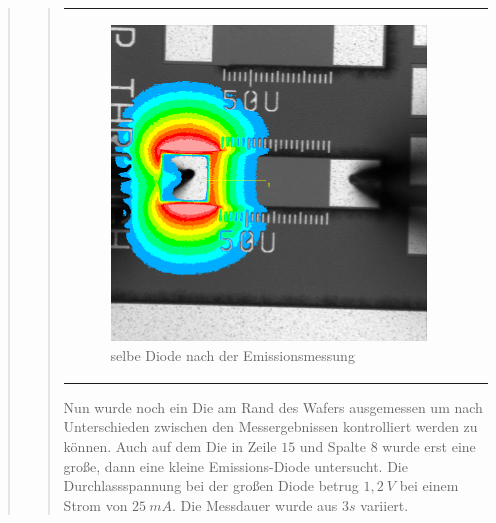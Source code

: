 \begin{quote}
\begin{quote}
\begin{center}
\begin{tabular}{ll}
\begin{minipage}{0.6\textwidth}
                         \begin{figure}[H]
                            \label{fig:asdfasdfasdfggg}
                            \includegraphics[scale=0.25, trim = 0cm 0cm 0cm
                            0cm,
                            clip]{./Emissionsbilder/zwei/nach_Emissionsmessung_Intensitat_Distanz.png}
                            \caption{selbe Diode nach der Emissionsmessung}
                        \end{figure}
                   \vspace{-1.5em}

                    \end{minipage}

                \end{tabular}
                \end{center}

        \vspace{2em}

        Nun wurde noch ein Die am Rand des Wafers ausgemessen um nach
        Unterschieden zwischen den Messergebnissen kontrolliert werden zu
        können. Auch auf dem Die in Zeile $15$ und Spalte $8$ wurde erst eine
        große, dann eine kleine Emissions-Diode untersucht. Die Durchlassspannung bei der
        großen Diode betrug $1,2\ V$ bei einem Strom von $25\ mA$. Die Messdauer
        wurde aus $3s$ variiert.



\end{quote}
\end{quote}
